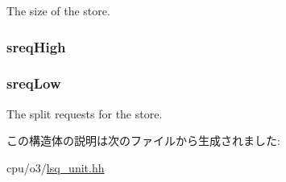 \label{structLSQUnit_1_1SQEntry_ae5dc6ffcd9b7605c7787791e40cc6bb0}
The size of the store. \hypertarget{structLSQUnit_1_1SQEntry_a1464e1dd7de6d5752d05938f0b3bc171}{
\subsubsection[{sreqHigh}]{ {\bf sreqHigh}}}
\label{structLSQUnit_1_1SQEntry_a1464e1dd7de6d5752d05938f0b3bc171}
\hypertarget{structLSQUnit_1_1SQEntry_a8c06ecd03202f5de1fc60cf6194ff285}{
\subsubsection[{sreqLow}]{ {\bf sreqLow}}}
\label{structLSQUnit_1_1SQEntry_a8c06ecd03202f5de1fc60cf6194ff285}
The split requests for the store. 

この構造体の説明は次のファイルから生成されました:\begin{DoxyCompactItemize}
\item 
cpu/o3/\hyperlink{o3_2lsq__unit_8hh}{lsq\_\-unit.hh}\end{DoxyCompactItemize}
